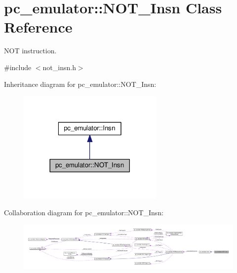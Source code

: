 \hypertarget{classpc__emulator_1_1NOT__Insn}{}\section{pc\+\_\+emulator\+:\+:N\+O\+T\+\_\+\+Insn Class Reference}
\label{classpc__emulator_1_1NOT__Insn}


N\+OT instruction.  




{\ttfamily \#include $<$not\+\_\+insn.\+h$>$}



Inheritance diagram for pc\+\_\+emulator\+:\+:N\+O\+T\+\_\+\+Insn\+:\nopagebreak
\begin{figure}[H]
\begin{center}
\leavevmode
\includegraphics[width=201pt]{classpc__emulator_1_1NOT__Insn__inherit__graph}
\end{center}
\end{figure}


Collaboration diagram for pc\+\_\+emulator\+:\+:N\+O\+T\+\_\+\+Insn\+:\nopagebreak
\begin{figure}[H]
\begin{center}
\leavevmode
\includegraphics[width=350pt]{classpc__emulator_1_1NOT__Insn__coll__graph}
\end{center}
\end{figure}

